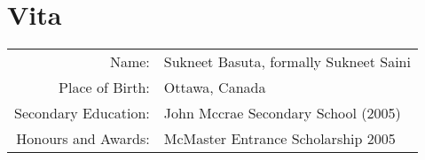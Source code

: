 \chapter*{Vita}

\begin{center}
\begin{tabular}{rl}
  \sc Name: &Sukneet Basuta, formally Sukneet Saini \\
  \sc Place of Birth:&Ottawa, Canada\\
  \sc Secondary Education:&John Mccrae Secondary School (2005)\\
  \sc Honours and Awards:&McMaster Entrance Scholarship 2005
\end{tabular}
\end{center}